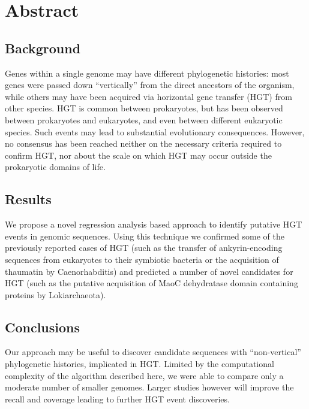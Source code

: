 \section{Abstract}
\label{abstract}
\subsection{Background}
Genes within a single genome may have different phylogenetic histories: most
genes were passed down ``vertically'' from the direct ancestors of the
organism, while others may have been acquired via horizontal gene transfer
(HGT) from other species. HGT is common between prokaryotes, but has been
observed between prokaryotes and eukaryotes, and even between different
eukaryotic species. Such events may lead to substantial evolutionary
consequences. However, no consensus has been reached neither on the necessary
criteria required to confirm HGT, nor about the scale on which HGT may occur
outside the prokaryotic domains of life.
\subsection{Results}
We propose a novel regression analysis based approach to identify putative HGT
events in genomic sequences. Using this technique we confirmed some of the
previously reported cases of HGT (such as the transfer of ankyrin-encoding
sequences from eukaryotes to their symbiotic bacteria or the acquisition of
thaumatin by Caenorhabditis) and predicted a number of novel candidates for HGT
(such as the putative acquisition of MaoC dehydratase domain containing
proteins by Lokiarchaeota).
\subsection{Conclusions}
Our approach may be useful to discover candidate sequences with
``non-vertical'' phylogenetic histories, implicated in HGT.
Limited by the computational complexity of the algorithm described here, we
were able to compare only a moderate number of smaller genomes. Larger studies
however will improve the recall and coverage leading to further HGT event
discoveries.
